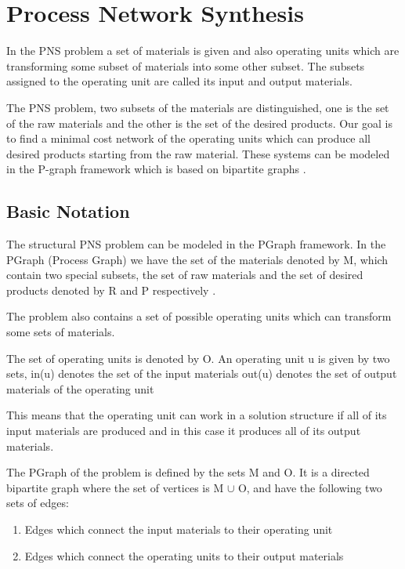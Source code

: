  




\section{Process Network Synthesis}

In the PNS problem a set of materials is given and also operating units 
which are transforming some subset of materials into some other subset. 
The subsets assigned to the operating unit are called its input and output materials\cite{pns3, pns1}.

The PNS problem, two subsets of the materials are distinguished, 
one is the set of the raw materials and the other is the set of the desired products. 
Our goal is to find a minimal cost network of the operating units which can produce all desired products starting from the raw material. 
These systems can be modeled in the P-graph framework which is based on bipartite graphs \cite{pns6 ,pns3}. 

\subsection{Basic Notation}

The structural PNS problem can be modeled in the PGraph framework.
In the PGraph (Process Graph) we have the set of the materials denoted by M,
which contain two special subsets, the set of raw materials and the set of 
desired products denoted by R and P respectively \cite{pns3}.

The problem also contains a set of possible operating units which can transform some sets of materials. 

The set of operating units is denoted by O. An operating unit u is given by two sets, 
in(u) denotes the set of the input materials out(u) denotes the set of output materials of the operating unit

This means that the operating unit can work in a solution structure if all of its input materials are produced and in this case it 
produces all of its output materials\cite{pns3 ,pns1}. 

The PGraph of the problem is defined by the sets M and O. It is a directed bipartite graph where the set of vertices is M $\cup$ O, and have the following two sets of edges:
\begin{enumerate}
\item Edges which connect the input materials to their operating unit
\item Edges which connect the operating units to their output materials
\end{enumerate}

